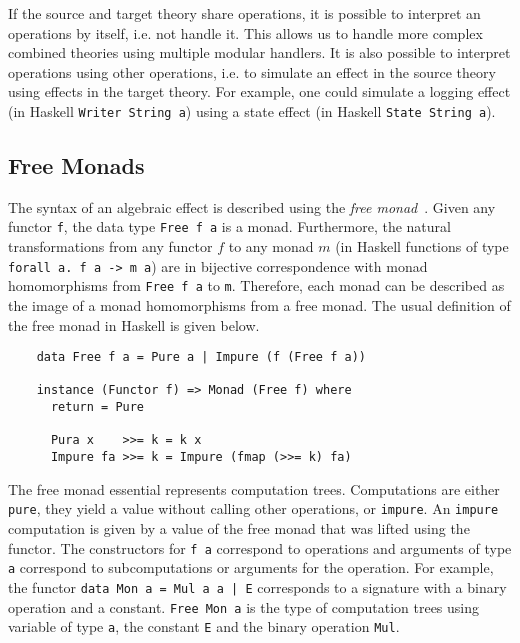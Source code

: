 If the source and target theory share operations, it is possible to interpret an
operations by itself, i.e. not handle it.
This allows us to handle more complex combined theories using multiple modular
handlers.
It is also possible to interpret operations using other operations, i.e. to
simulate an effect in the source theory using effects in the target theory.
For example, one could simulate a logging effect (in Haskell \texttt{Writer String
  a}) using a state effect (in Haskell \texttt{State String a}).


\subsection{Free Monads}
\label{preliminaries:free-monad}

The syntax of an algebraic effect is described using the \textit{free
monad}~\cite{DBLP:journals/jfp/Swierstra08}.
Given any functor \texttt{f}, the data type \texttt{Free f a} is a monad.
Furthermore, the natural transformations from any functor $f$ to any monad $m$
(in Haskell functions of type \texttt{forall a. f a -> m a}) are in bijective
correspondence with monad homomorphisms from \texttt{Free f a} to \texttt{m}.
Therefore, each monad can be described as the image of a monad homomorphisms
from a free monad.
The usual definition of the free monad in Haskell is given below.

\begin{verbatim}
    data Free f a = Pure a | Impure (f (Free f a))

    instance (Functor f) => Monad (Free f) where
      return = Pure

      Pura x    >>= k = k x
      Impure fa >>= k = Impure (fmap (>>= k) fa)
\end{verbatim}
The free monad essential represents computation trees.
Computations are either \texttt{pure}, they yield a value without calling
other operations, or \texttt{impure}.
An \texttt{impure} computation is given by a value of the free monad that was
lifted using the functor.
The constructors for \texttt{f a} correspond to operations and arguments of type
\texttt{a} correspond to subcomputations or arguments for the operation.
For example, the functor \texttt{data Mon a = Mul a a | E}
corresponds to a signature with a binary operation and a constant.
\texttt{Free Mon a} is the type of computation trees using variable
of type \texttt{a}, the constant \texttt{E} and the binary operation
\texttt{Mul}.

